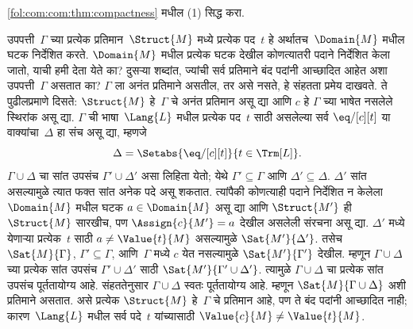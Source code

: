 \begin{prob}
\ref{fol:com:com:thm:compactness} मधील (1) सिद्ध करा.
\end{prob}





\begin{ex}
उपपत्ती~$\Gamma$ च्या प्रत्येक प्रतिमान~$\Struct{M}$ मध्ये प्रत्येक
पद~$t$ हे अर्थातच~$\Domain{M}$ मधील घटक निर्देशित करते.
$\Domain{M}$ मधील प्रत्येक घटक देखील कोणत्यातरी पदाने निर्देशित
केला जातो, याची हमी देता येते का? दुसऱ्या शब्दांत, ज्यांची सर्व प्रतिमाने
बंद पदांनी आच्छादित आहेत अशा उपपत्ती~$\Gamma$ असतात का? $\Gamma$ ला
अनंत प्रतिमाने असतील, तर असे नसते, हे संहतता प्रमेय दाखवते. ते पुढीलप्रमाणे
दिसते: $\Struct{M}$ हे~$\Gamma$ चे अनंत प्रतिमान असू द्या आणि $c$ हे
$\Gamma$ च्या भाषेत नसलेले स्थिरांक असू द्या. $\Gamma$ ची
भाषा~$\Lang{L}$ मधील प्रत्येक पद~$t$ साठी असलेल्या सर्व
$\eq/[c][t]$ या वाक्यांचा~$\Delta$ हा संच असू द्या, म्हणजे
  \[  \Delta = \Setabs{\eq/[c][t]}{t \in \Trm[L]}.
  \]
$\Gamma \cup \Delta$ चा सांत उपसंच $\Gamma' \cup \Delta'$ असा लिहिता
येतो; येथे $\Gamma' \subseteq \Gamma$ आणि $\Delta' \subseteq \Delta$.
$\Delta'$ सांत असल्यामुळे त्यात फक्त सांत अनेक पदे असू शकतात.
त्यांपैकी कोणत्याही पदाने निर्देशित न केलेला $\Domain{M}$ मधील
घटक $a \in \Domain{M}$ असू द्या आणि $\Struct{M'}$ ही
$\Struct{M}$ सारखीच, पण $\Assign{c}{M'} = a$ देखील असलेली संरचना
असू द्या. $\Delta'$ मध्ये येणाऱ्या प्रत्येक~$t$ साठी
$a \neq \Value{t}{M}$ असल्यामुळे $\Sat{M'}{\Delta'}$. तसेच
$\Sat{M}{\Gamma}$, $\Gamma' \subseteq \Gamma$, आणि~$\Gamma$ मध्ये $c$
येत नसल्यामुळे $\Sat{M'}{\Gamma'}$ देखील. म्हणून $\Gamma \cup \Delta$
च्या प्रत्येक सांत उपसंच $\Gamma' \cup \Delta'$ साठी
$\Sat{M'}{\Gamma' \cup \Delta'}$. त्यामुळे $\Gamma \cup \Delta$ चा
प्रत्येक सांत उपसंच पूर्ततायोग्य आहे. संहततेनुसार $\Gamma \cup \Delta$
स्वतः पूर्ततायोग्य आहे. म्हणून $\Sat{M}{\Gamma \cup \Delta}$ अशी
प्रतिमाने असतात. असे प्रत्येक $\Struct{M}$ हे~$\Gamma$ चे प्रतिमान आहे,
पण ते बंद पदांनी आच्छादित नाही; कारण~$\Lang{L}$ मधील सर्व पदे~$t$
यांच्यासाठी $\Value{c}{M} \neq \Value{t}{M}$.
\end{ex}

